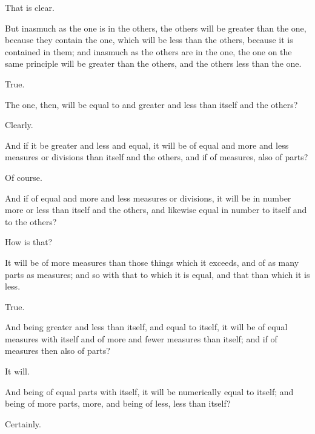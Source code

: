 \documentclass[11pt,letter]{article}
\begin{document}
\par  That is clear.

\par  But inasmuch as the one is in the others, the others will be greater than the one, because they contain the one, which will be less than the others, because it is contained in them; and inasmuch as the others are in the one, the one on the same principle will be greater than the others, and the others less than the one.

\par  True.

\par  The one, then, will be equal to and greater and less than itself and the others?

\par  Clearly.

\par  And if it be greater and less and equal, it will be of equal and more and less measures or divisions than itself and the others, and if of measures, also of parts?

\par  Of course.

\par  And if of equal and more and less measures or divisions, it will be in number more or less than itself and the others, and likewise equal in number to itself and to the others?

\par  How is that?

\par  It will be of more measures than those things which it exceeds, and of as many parts as measures; and so with that to which it is equal, and that than which it is less.

\par  True.

\par  And being greater and less than itself, and equal to itself, it will be of equal measures with itself and of more and fewer measures than itself; and if of measures then also of parts?

\par  It will.

\par  And being of equal parts with itself, it will be numerically equal to itself; and being of more parts, more, and being of less, less than itself?

\par  Certainly.
\end{document}

